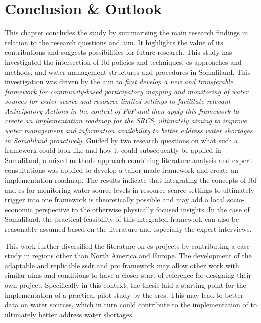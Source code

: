 \chapter{Conclusion \& Outlook}

\label{chapter6}

This chapter concludes the study by summarising the main research findings in relation to the research questions and aim. It highlights the value of its contributions and suggests possibilities for future research.\newline
This study has investigated the intersection of \acrfull{fbf} policies and techniques, \acrfull{cs} approaches and methods, and water management structures and procedures in Somaliland. This investigation was driven by the aim to \textit{first develop a new and transferable framework for community-based participatory mapping and monitoring of water sources for water-scarce and resource-limited settings to facilitate relevant Anticipatory Actions in the context of FbF and then apply this framework to create an implementation roadmap for the SRCS, ultimately aiming to improve water management and information availability to better address water shortages in Somaliland proactively}.\newline
Guided by two research questions on what such a framework could look like and how it could subsequently be applied in Somaliland, a mixed-methods approach combining literature analysis and expert consultations was applied to develop a tailor-made framework and create an implementation roadmap. The results indicate that integrating the concepts of \acrshort{fbf} and \acrshort{cs} for monitoring water source levels in resource-scarce settings to ultimately trigger  into one framework is theoretically possible and may add a local socio-economic perspective to the otherwise physically focused insights. In the case of Somaliland, the practical feasibility of this integrated framework can also be reasonably assumed based on the literature and especially the expert interviews.

This work further diversified the literature on \acrlong{cs} projects by contributing a case study in regions other than North America and Europe. The development of the adaptable and replicable \acrlong{ssdr} and \acrlong{prc} framework may allow other work with similar aims and conditions to have a closer start of reference for designing their own project. Specifically in this context, the thesis laid a starting point for the implementation of a practical pilot study by the \acrlong{srcs}. This may lead to better data on water sources, which in turn could contribute to the implementation of  to ultimately better address water shortages.

